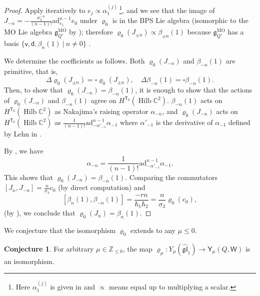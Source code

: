 \documentclass[10pt]{amsart}
\theoremstyle{definition}
\newtheorem{Conjecture}[Theorem]{Conjecture}
\newtheorem{Remark}[Theorem]{Remark}
\numberwithin{equation}{section}
\newcommand{\bC}{\mathbb{C}}
\newcommand{\bZ}{\mathbb{Z}}
\newcommand{\sT}{\mathsf{T}}
\newcommand{\sW}{\mathsf{W}}
\newcommand{\Hilb}{\operatorname{Hilb}}
\begin{document}
\begin{proof}
Apply \cite[Prop.~5.2]{Dav3} iteratively to $e_j\propto \alpha_1^{(j)}$\,\footnote{Here $\alpha_1^{(j)}$ is given in \cite[\S 5]{Dav3} and $\propto$ means equal up to multiplying a scalar.}, and we see that the image of $J_{-n}=-\frac{\sigma_3^{-n}}{(n-1)!} \text{ad}^{n-1} _{e_1} e_0$ under $\varrho_0$ is in the BPS Lie algebra (isomorphic to the MO Lie algebra $\mathfrak{g}_{Q'}^{\mathrm{MO}}$ by \cite{BD}); therefore $\varrho_0(J_{\pm n})\propto \beta_{\pm n}(1)$ because $\mathfrak{g}_{Q'}^{\mathrm{MO}}$ has a basis $\{\mathsf v,\mathsf d,\beta_n(1)\:|\: n\neq 0\}$ \cite[\S 12.4.10]{MO}. 

We determine the coefficients as follows. Both $\varrho_0(J_{-n})$ and $\beta_{-n}(1)$ are primitive, that is, 
$$\Delta\varrho_0(J_{\pm n})=\square \varrho_0(J_{\pm n}), \quad \Delta\beta_{-n}(1)=\square \beta_{-n}(1). $$ 
Then, to show that $\varrho_0(J_{-n})=\beta_{-n}(1)$, it is enough to show that the actions of $\varrho_0(J_{-n})$ and $\beta_{-n}(1)$ agree on $H^{\sT_0}(\Hilb\bC^2)$. $\beta_{-n}(1)$ acts on $H^{\sT_0}(\Hilb\bC^2)$ as Nakajima's raising operator $\alpha_{-n}$, and $\varrho_0(J_{-n})$ acts on $H^{\sT_0}(\Hilb\bC^2)$ as $\frac{1}{(n-1)!} \text{ad}^{n-1} _{-\alpha'_{-1}} \alpha_{-1}$ where $\alpha'_{-1}$ is the derivative of $\alpha_{-1}$ defined by Lehn in \cite[Def.~3.8]{Leh}. 

By \cite[Thm.~3.10]{Leh}, we have $$\alpha_{-n}=\frac{1}{(n-1)!} \text{ad}^{n-1} _{-\alpha'_{-1}} \alpha_{-1}.$$ This shows that $\varrho_0(J_{-n})=\beta_{-n}(1)$. Comparing the commutators $[J_n,J_{-n}]=\frac{n}{\sigma_3}c_0$ (by direct computation) and 
$$[\beta_n(1),\beta_{-n}(1)]=\frac{-rn}{\hbar_1\hbar_2}=\frac{n}{\sigma_3}\varrho_0(c_0), $$ 
(by \cite[(12.6)]{MO}), we conclude that $\varrho_0(J_{n})=\beta_{n}(1)$.
\end{proof}


We conjecture that the isomorphism $\varrho_0$ extends to any $\mu\leqslant 0$.
\begin{Conjecture}
For arbitrary $\mu\in \bZ_{\leqslant 0}$, the map $\varrho_\mu\colon Y_{\mu}(\widehat{\mathfrak{gl}}_1)\to \mathsf Y_{\mu}(Q,\sW)$ is an isomorphism. 
\end{Conjecture}
\end{document}
